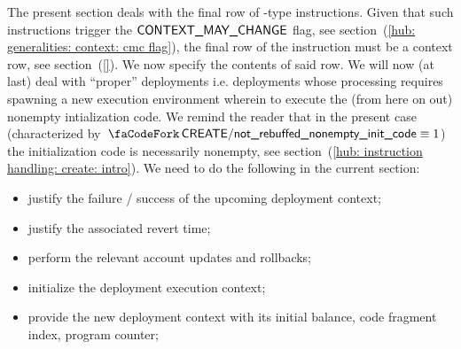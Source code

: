 \begin{center}
\end{center}
The present section deals with the final row of -type instructions.
Given that such instructions trigger the $\textsf{CONTEXT\_MAY\_CHANGE}$ flag, see section~(\ref{hub: generalities: context: cmc flag}), the final row of the instruction must be a context row, see section~(\ref{}).
We now specify the contents of said row.
We will now (at last) deal with ``proper'' deployments i.e. deployments whose processing requires spawning a new execution environment wherein to execute the (from here on out) nonempty intialization code. We remind the reader that in the present case (characterized by $\scenCreateExecutionNonEmptyInitCode \equiv 1$) the initialization code is necessarily nonempty, see section~(\ref{hub: instruction handling: create: intro}). We need to do the following in the current section:
\begin{itemize}
	\item justify the failure / success of the upcoming deployment context;
	\item justify the associated revert time;
	\item perform the relevant account updates and rollbacks;
	\item initialize the deployment execution context; 
	\item provide the new deployment context with its initial balance, code fragment index, program counter; 
\end{itemize}

